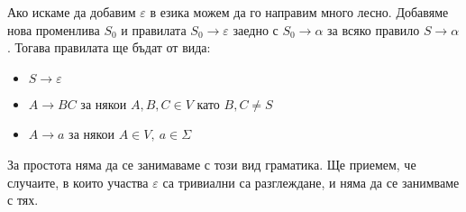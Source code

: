\begin{remark}
    Ако искаме да добавим $\varepsilon$ в езика можем да го направим много лесно.
    Добавяме нова променлива $S_0$ и правилата $S_0 \rightarrow \varepsilon$ заедно с $S_0 \rightarrow \alpha$ за всяко правило $S \rightarrow \alpha$.
    Тогава правилата ще бъдат от вида:

    \begin{itemize}
        \item $S \rightarrow \varepsilon$
        \item $A \rightarrow BC$ за някои $A, B, C \in V$ като $B, C \neq S$
        \item $A \rightarrow a$ за някои $A \in V, \: a \in \Sigma$
    \end{itemize}

    За простота няма да се занимаваме с този вид граматика.
    Ще приемем, че случаите, в които участва $\varepsilon$ са тривиални са разглеждане, и няма да се занимваме с тях.
\end{remark}
